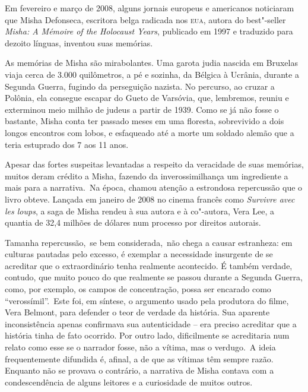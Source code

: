 Em fevereiro e março de 2008, alguns jornais europeus e americanos
noticiaram que Misha Defonseca, escritora belga radicada nos
\textsc{eua}, autora do best"-seller \emph{Misha: A Mémoire of the
Holocaust Years}, publicado em 1997 e traduzido para dezoito línguas,
inventou suas memórias.

As memórias de Misha são mirabolantes. Uma garota judia nascida em
Bruxelas viaja cerca de 3.000 quilômetros, a pé e sozinha, da Bélgica à
Ucrânia, durante a Segunda Guerra, fugindo da perseguição nazista. No
percurso, ao cruzar a Polônia, ela consegue escapar do Gueto de
Varsóvia, que, lembremos, reuniu e exterminou meio milhão de judeus a
partir de 1939. Como se já não fosse o bastante, Misha conta ter passado
meses em uma floresta, sobrevivido a dois longos encontros com lobos, e
esfaqueado até a morte um soldado alemão que a teria estuprado dos 7 aos
11 anos.

Apesar das fortes suspeitas levantadas a respeito da veracidade de suas
memórias, muitos deram crédito a Misha, fazendo da inverossimilhança um
ingrediente a mais para a narrativa.~Na época, chamou atenção a
estrondosa repercussão que o livro obteve. Lançada em janeiro de 2008 no
cinema francês como \emph{Survivre avec les loups}, a saga de Misha
rendeu à sua autora e à co"-autora, Vera Lee, a quantia de 32,4 milhões
de dólares num processo por direitos autorais.

Tamanha repercussão,~se bem considerada,~não chega a causar estranheza:
em culturas pautadas pelo excesso, é exemplar a necessidade insurgente
de se acreditar que o extraordinário tenha realmente acontecido. É
também verdade, contudo, que muito pouco do que realmente se passou
durante a Segunda Guerra, como, por exemplo, os campos de concentração,
possa ser encarado como ``verossímil''.~Este foi, em síntese, o
argumento usado pela produtora do filme, Vera Belmont, para defender o
teor de verdade da história. Sua aparente inconsistência apenas
confirmava sua autenticidade -- era preciso acreditar que a história
tinha de fato ocorrido. Por outro lado, dificilmente se acreditaria num
relato como esse se o narrador fosse, não a vítima, mas o
verdugo.~A ideia frequentemente difundida é, afinal, a de que as vítimas
têm sempre razão. Enquanto não se provava o contrário, a narrativa de
Misha contava com a condescendência de alguns leitores e a curiosidade
de muitos outros.

